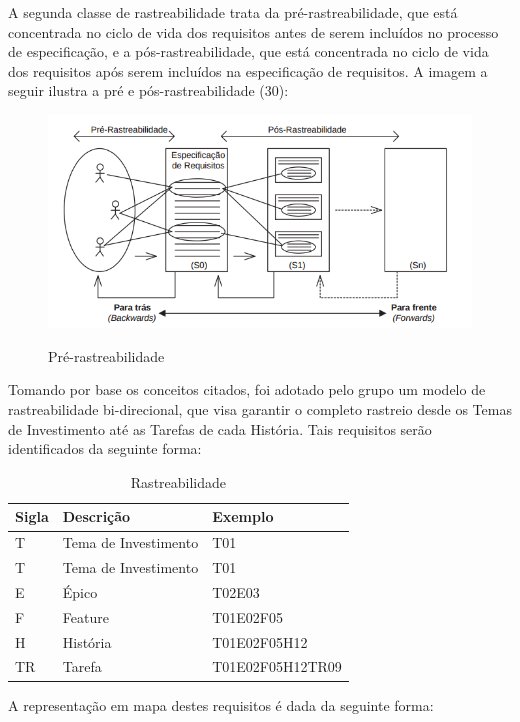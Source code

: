 A segunda classe de rastreabilidade trata da pré-rastreabilidade, que está concentrada no ciclo de vida dos requisitos antes de serem incluídos no processo de especificação, e a pós-rastreabilidade, que está concentrada no ciclo de vida dos requisitos após serem incluídos na especificação de requisitos. A imagem a seguir ilustra a pré e pós-rastreabilidade (30):


\FloatBarrier
\begin{figure}[!htpd]
		\centering
		\includegraphics[scale=0.8]{figuras/rastrabilidadepre}
		\label{img:SAF}
		\caption{Pré-rastreabilidade}
\end{figure}
\FloatBarrier

Tomando por base os conceitos citados, foi adotado pelo grupo um modelo de rastreabilidade bi-direcional, que visa garantir o completo rastreio desde os Temas de Investimento até as Tarefas de cada História. Tais requisitos serão identificados da seguinte forma:

\begin{table}[\htp]
\centering
\caption{Rastreabilidade}
\label{my-label}
\begin{tabular}{|l|l|l|}
Sigla & Descrição & Exemplo \\ \hline
T & Tema de Investimento & T01 \\ \hline
T & Tema de Investimento & T01 \\ \hline
E & Épico & T02E03 \\ \hline
F & Feature & T01E02F05 \\ \hline
H & História & T01E02F05H12 \\ \hline
TR & Tarefa & T01E02F05H12TR09 \\ \hline
\end{tabular}
\end{table}

A representação em mapa destes requisitos é dada da seguinte forma:

